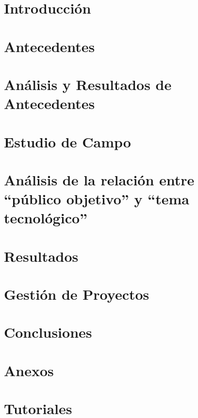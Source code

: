\documentclass[11pt,letterpaper]{article}
\begin{document}

\tableofcontents
\newpage

\section{Introducción}
\label{sec:introduccion}


\newpage
\section{Antecedentes}
\label{sec:antecedentes}


\newpage
\section{Análisis y Resultados de Antecedentes}
\label{sec:analisis}


\newpage
\section{Estudio de Campo}
\label{sec:estudio}


\newpage
\section{Análisis de la relación entre ``público objetivo'' y ``tema tecnológico''}
\label{sec:relacion}


\newpage
\section{Resultados}
\label{sec:resultados}


\newpage
\section{Gestión de Proyectos}
\label{sec:gestion}


\newpage
\section{Conclusiones}
\label{sec:conclusiones}


\newpage


\newpage
\section{Anexos}
\label{sec:anexos}


\newpage
\section{Tutoriales}
\label{sec:anexos2}

\end{document}
